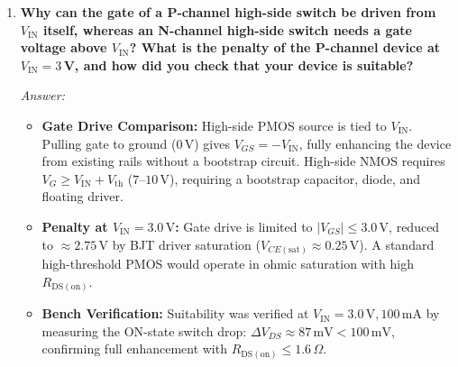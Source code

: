 \documentclass[12pt,a4paper]{article}
\newcommand{\Vout}{V_{\mathrm{OUT}}}
\newcommand{\Vin}{V_{\mathrm{IN}}}
\newcommand{\Vc}{V_C}
\newcommand{\Rdson}{R_{\mathrm{DS(on)}}}
\begin{document}
\begin{enumerate}[leftmargin=1.8em, label=\textbf{Q\arabic*.}, itemsep=1.0em]
    \emph{Answer:}
    \begin{itemize}[itemsep=2pt, topsep=2pt]
        \item \textbf{Low Crossover Rationale:} The LC filter resonance is $f_o \approx 252\,\mathrm{Hz}$ (with a $-180^\circ$ phase drop). Placing the integrator crossover at $f_c \approx 15\text{--}25\,\mathrm{Hz} \ll f_o$ ensures the loop crosses $0\,\mathrm{dB}$ where phase lag is only $-90^\circ$, guaranteeing an unconditional $\approx 90^\circ$ phase margin without requiring sensitive phase-lead networks.
        \item \textbf{Compensator Improvement:} Add a zero resistor $R_z$ in series with $C_i$ (Type-II compensator) to provide $+90^\circ$ phase boost, pushing $f_c > 1\,\mathrm{kHz}$ and shortening settling time to $< 1\,\mathrm{ms}$.
        \item \textbf{Modulator Improvement ($\Vin$ Feedforward):} Make ramp amplitude proportional to line voltage ($V_{\mathrm{ramp}} = k \cdot \Vin$). Then $D = \Vc / (k \Vin)$, giving $\Vout = D \Vin = \Vc / k$. Line variations are cancelled cycle-by-cycle without waiting for the feedback integrator.
        \item \textbf{Dynamic Step Response:} Figure~\ref{fig:plot2_transient} demonstrates the simulated closed-loop line-step ($4.0\,\mathrm{V} \to 5.0\,\mathrm{V}$) and load-step dynamic recovery, illustrating the $\approx 35\,\mathrm{ms}$ settling behavior resulting from the slow loop.
    \end{itemize}

    \item \textbf{Why can the gate of a P-channel high-side switch be driven from $\Vin$ itself, whereas an N-channel high-side switch needs a gate voltage above $\Vin$? What is the penalty of the P-channel device at $\Vin = 3$\,V, and how did you check that your device is suitable?}
    
    \emph{Answer:}
    \begin{itemize}[itemsep=2pt, topsep=2pt]
        \item \textbf{Gate Drive Comparison:} High-side PMOS source is tied to $\Vin$. Pulling gate to ground ($0\,\mathrm{V}$) gives $V_{GS} = -\Vin$, fully enhancing the device from existing rails without a bootstrap circuit. High-side NMOS requires $V_G \ge \Vin + V_{\mathrm{th}}$ ($7\text{--}10\,\mathrm{V}$), requiring a bootstrap capacitor, diode, and floating driver.
        \item \textbf{Penalty at $\Vin = 3.0\,\mathrm{V}$:} Gate drive is limited to $|V_{GS}| \le 3.0\,\mathrm{V}$, reduced to $\approx 2.75\,\mathrm{V}$ by BJT driver saturation ($V_{CE(\mathrm{sat})} \approx 0.25\,\mathrm{V}$). A standard high-threshold PMOS would operate in ohmic saturation with high $\Rdson$.
        \item \textbf{Bench Verification:} Suitability was verified at $\Vin = 3.0\,\mathrm{V}, 100\,\mathrm{mA}$ by measuring the ON-state switch drop: $\Delta V_{DS} \approx 87\,\mathrm{mV} < 100\,\mathrm{mV}$, confirming full enhancement with $\Rdson \le 1.6\,\Omega$.
    \end{itemize}


\end{enumerate}
\end{document}
